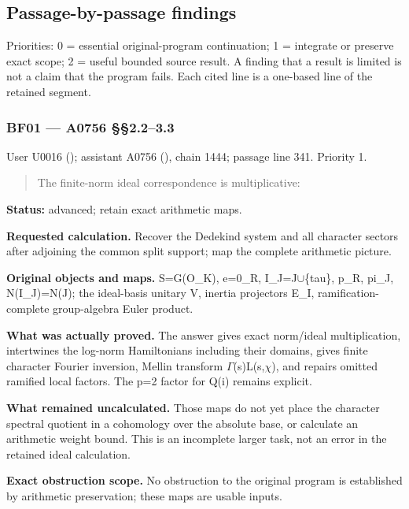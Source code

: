 \documentclass[10pt,a4paper,oneside]{report}
\begin{document}
\subsection{Passage-by-passage
findings}\label{passage-by-passage-findings}

Priorities: 0 = essential original-program continuation; 1 = integrate
or preserve exact scope; 2 = useful bounded source result. A finding
that a result is limited is not a claim that the program fails. Each
cited line is a one-based line of the retained segment.

\subsubsection{BF01 --- A0756 §§2.2--3.3}\label{bf01-a0756-2.23.3}

User U0016 (\protect{});
assistant A0756 (\protect{}),
chain 1444; passage line 341. Priority 1.

\begin{quote}
The finite-norm ideal correspondence is multiplicative:
\end{quote}

\textbf{Status:} advanced; retain exact arithmetic maps.

\textbf{Requested calculation.} Recover the Dedekind system and all
character sectors after adjoining the common split support; map the
complete arithmetic picture.

\textbf{Original objects and maps.} S=G(O\_K), e=0\_R,
I\_J=J\allowbreak{}\ensuremath{∪}\allowbreak{}\{tau\}, p\_R, pi\_J,
N(I\_J)=N(J); the ideal-basis unitary V, inertia projectors E\_I,
ramification-complete group-algebra Euler product.

\textbf{What was actually proved.} The answer gives exact norm/ideal
multiplication, intertwines the log-norm Hamiltonians including their
domains, gives finite character Fourier inversion, Mellin transform
\allowbreak{}\ensuremath{Γ}\allowbreak{}(s)L(s,\allowbreak{}\ensuremath{χ}\allowbreak{}),
and repairs omitted ramified local factors. The p=2 factor for Q(i)
remains explicit.

\textbf{What remained uncalculated.} Those maps do not yet place the
character spectral quotient in a cohomology over the absolute base, or
calculate an arithmetic weight bound. This is an incomplete larger task,
not an error in the retained ideal calculation.

\textbf{Exact obstruction scope.} No obstruction to the original program
is established by arithmetic preservation; these maps are usable inputs.
\end{document}
